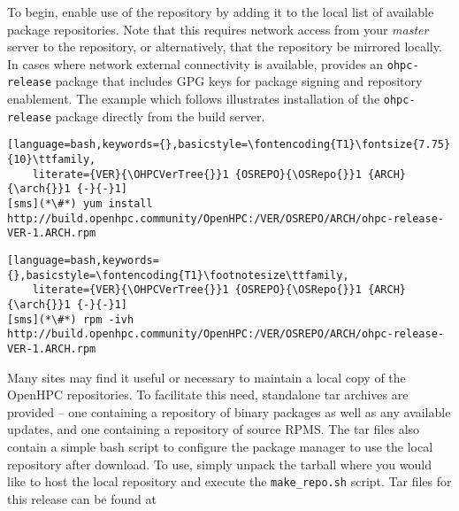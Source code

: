 To begin, enable use of the \OHPC{} repository by adding it to the local list
of available package repositories. Note that this requires network access from
your {\em master} server to the \OHPC{} repository, or alternatively, that
the \OHPC{} repository be mirrored locally.  In cases where network external
connectivity is available, \OHPC{} provides an \texttt{ohpc-release} package
that includes GPG keys for package signing and repository enablement.  The
example which follows illustrates installation of the \texttt{ohpc-release}
package directly from the \OHPC{} build server.

\begin{lstlisting}[language=bash,keywords={},basicstyle=\fontencoding{T1}\fontsize{7.75}{10}\ttfamily,
	literate={VER}{\OHPCVerTree{}}1 {OSREPO}{\OSRepo{}}1 {ARCH}{\arch{}}1 {-}{-}1]
[sms](*\#*) yum install http://build.openhpc.community/OpenHPC:/VER/OSREPO/ARCH/ohpc-release-VER-1.ARCH.rpm
\end{lstlisting}
\else
\begin{lstlisting}[language=bash,keywords={},basicstyle=\fontencoding{T1}\footnotesize\ttfamily,
	literate={VER}{\OHPCVerTree{}}1 {OSREPO}{\OSRepo{}}1 {ARCH}{\arch{}}1 {-}{-}1]
[sms](*\#*) rpm -ivh http://build.openhpc.community/OpenHPC:/VER/OSREPO/ARCH/ohpc-release-VER-1.ARCH.rpm
\end{lstlisting}
\fi

\begin{center}
\begin{tcolorbox}[]
\small Many sites may find it useful or necessary to maintain a local copy of the
OpenHPC repositories. To facilitate this need, standalone tar 
archives are provided -- one containing a repository of binary packages as well as any
available updates, and one containing a repository of source RPMS. The tar files
also contain a simple bash script to configure the package manager to use the
local repository after download. To use, simply unpack the tarball where you
would like to host the local repository and execute the \texttt{make\_repo.sh} script.
Tar files for this release can be found at \href{http://build.openhpc.community/dist/\OHPCVersion}
        {\color{blue}{http://build.openhpc.community/dist/\OHPCVersion}}
\end{tcolorbox}
\end{center}

